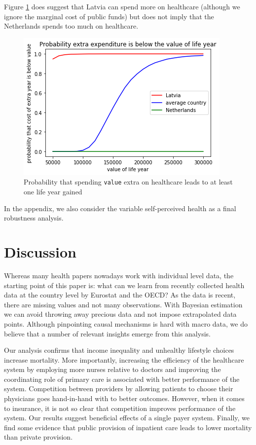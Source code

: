 \documentclass[12pt,english,a4paper]{article}
\begin{document}
Figure \ref{fig:org8b35395} does suggest that Latvia can spend more on healthcare (although we ignore the marginal cost of public funds) but does not imply that the Netherlands spends too much on healthcare.


\begin{figure}[htbp]
\centering
\includegraphics[width=.9\linewidth]{./figures/value_life.png}
\caption{\label{fig:org8b35395}Probability that spending \texttt{value} extra on healthcare leads to at least one life year gained}
\end{figure}

In the appendix, we also consider the variable self-perceived health as a final robustness analysis.


\section{Discussion}
\label{sec:org87398ad}

Whereas many health papers nowadays work with individual level data, the starting point of this paper is: what can we learn from recently collected health data at the country level by Eurostat and the OECD? As the data is recent, there are missing values and not many observations. With Bayesian estimation we can avoid throwing away precious data and not impose extrapolated data points. Although pinpointing causal mechanisms is hard with macro data, we do believe that a number of relevant insights emerge from this analysis.

Our analysis confirms that income inequality and unhealthy lifestyle choices increase mortality. More importantly, increasing the efficiency of the healthcare system by employing more nurses relative to doctors and improving the coordinating role of primary care is associated with better performance of the system. Competition between providers by allowing patients to choose their physicians goes hand-in-hand with to better outcomes. However, when it comes to insurance, it is not so clear that competition improves performance of the system. Our results suggest beneficial effects of a single payer system. Finally, we find some evidence that public provision of inpatient care leads to lower mortality than private provision.
\end{document}
